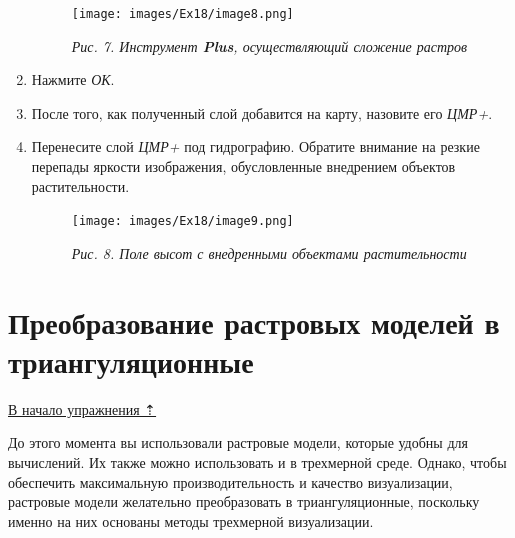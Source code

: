 \documentclass[12pt,]{book}
\begin{document}
\begin{enumerate}
  \begin{figure}
  \centering
  \texttt{[image: images/Ex18/image8.png]}
  \caption{\emph{Рис. 7. Инструмент \textbf{Plus}, осуществляющий сложение растров}}
  \end{figure}
\item
  Нажмите \emph{ОК}.
\item
  После того, как полученный слой добавится на карту, назовите его \emph{ЦМР+}.
\item
  Перенесите слой \emph{ЦМР+} под гидрографию. Обратите внимание на резкие перепады яркости изображения, обусловленные внедрением объектов растительности.

  \begin{figure}
  \centering
  \texttt{[image: images/Ex18/image9.png]}
  \caption{\emph{Рис. 8. Поле высот с внедренными объектами растительности}}
  \end{figure}
\end{enumerate}

\hypertarget{threed-modelling-rastertotin}{%
\section{Преобразование растровых моделей в триангуляционные}\label{threed-modelling-rastertotin}}

\protect\hyperlink{threed-modelling}{В начало упражнения ⇡}

До этого момента вы использовали растровые модели, которые удобны для вычислений. Их также можно использовать и в трехмерной среде. Однако, чтобы обеспечить максимальную производительность и качество визуализации, растровые модели желательно преобразовать в триангуляционные, поскольку именно на них основаны методы трехмерной визуализации.
\end{document}
